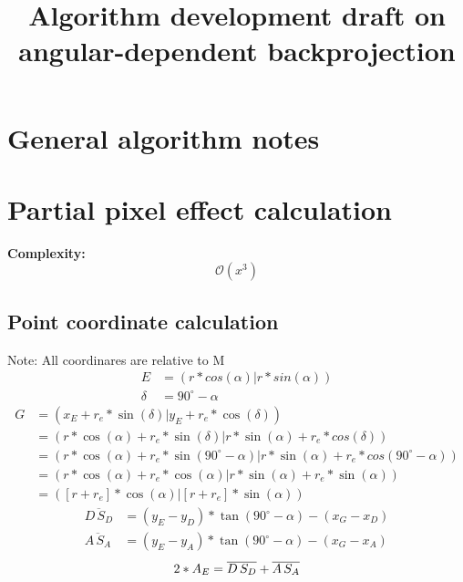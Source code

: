 \documentclass[a4paper,10pt,fleqn]{scrartcl}
\date{}
\title{Algorithm development draft on angular-dependent backprojection}
\begin{document}
\maketitle
\section{General algorithm notes}
\section{Partial pixel effect calculation}
\textbf{Complexity:}
\begin{equation}
\mathcal{O}(x^3)
\end{equation}
\subsection{Point coordinate calculation}
\textrm{Note: All coordinares are relative to M}
\begin{align}
E &= (r * cos(\alpha) | r * sin(\alpha)) \\
\delta &= 90^\circ - \alpha
\end{align}
\begin{equation}
\begin{split}
G &= (x_E + r_e * \sin(\delta) | y_E + r_e * \cos(\delta)) \\
  &= (r * \cos(\alpha) + r_e * \sin(\delta) | r * \sin(\alpha) + r_e * cos(\delta))\\
  &= (r * \cos(\alpha) + r_e * \sin(90^\circ - \alpha) | r * \sin(\alpha) + r_e * cos(90^\circ - \alpha))\\
  &= (r * \cos(\alpha) + r_e * \cos(\alpha) | r * \sin(\alpha) + r_e * \sin(\alpha))\\
  &= ([r + r_e] * \cos(\alpha) | [r + r_e] * \sin(\alpha))
\end{split}
\end{equation}
\begin{align}
 \overline{D\,S_D} &= (y_E - y_D) * \tan(90^\circ-\alpha) - (x_G - x_D) \\
 \overline{A\,S_A} &= (y_E - y_A) * \tan(90^\circ-\alpha) - (x_G - x_A)
\end{align}
\begin{equation}
2 * A_E = \overline{D\,S_D} + \overline{A\,S_A} \\ %
\end{equation}
\newpage
\end{document}
